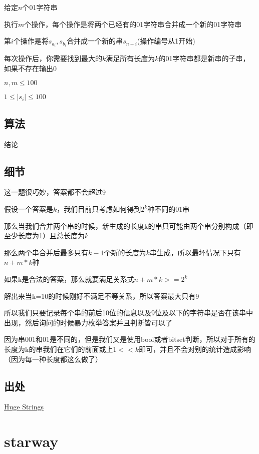 \documentclass[a4paper]{article}
\begin{document}
		给定$n$个01字符串
		
		执行$m$个操作，每个操作是将两个已经有的01字符串合并成一个新的01字符串
		
		第$i$个操作是将$s_{a_i},s_{b_i}$合并成一个新的串$s_{n+i}$(操作编号从1开始)
		
		每次操作后，你需要找到最大的$k$满足所有长度为$k$的01字符串都是新串的子串，如果不存在输出0
		
		$n,m \leq 100$
		
		$1 \leq |s_i| \leq 100$
		
	\subsection{算法}
		
		结论
		
	\subsection{细节}
		
		这一题很巧妙，答案都不会超过9
		
		假设一个答案是$k$，我们目前只考虑如何得到$2^k$种不同的01串
		
		那么当我们合并两个串的时候，新生成的长度k的串只可能由两个串分别构成（即至少长度为1）且总长度为$k$
		
		那么两个串合并后最多只有$k-1$个新的长度为$k$串生成，所以最坏情况下只有$n + m * k$种
		
		如果k是合法的答案，那么就要满足关系式$n + m * k >= 2^k$
		
		解出来当k=10的时候刚好不满足不等关系，所以答案最大只有9
		
		所以我们只要记录每个串的前后10位的信息以及9位及以下的字符串是否在该串中出现，然后询问的时候暴力枚举答案并且判断皆可以了
		
		因为串001和01是不同的，但是我们又是使用bool或者bitset判断，所以对于所有的长度为k的串我们在它们的前面或上$1<<k$即可，并且不会对别的统计造成影响（因为每一种长度都这么做了）
		
	\subsection{出处}
		
		\href {http://codeforces.com/problemset/problem/868/D}{Huge Strings}
	
	\newpage
	
	\section{starway}
		
\end{document}
